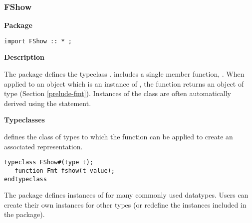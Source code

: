 \subsubsection{FShow}
\label{package-fshow}

{\bf Package}

\begin{verbatim}
import FShow :: * ;
\end{verbatim}




{\bf Description}

The  package defines the typeclass .  
includes a single member function, .  When applied to an
object which is an instance of , the  function
returns an object of type  (Section \ref{prelude-fmt}).
Instances of the  class are often automatically derived
using the  statement.


{\bf Typeclasses}

 defines the class of types to which the function 
can be applied to create an associated  representation.

\begin{verbatim}
typeclass FShow#(type t);
   function Fmt fshow(t value);
endtypeclass
\end{verbatim}


The package defines instances of  for many commonly used
datatypes.  Users can create their own  instances for other types
(or redefine the instances included in the  package). 

